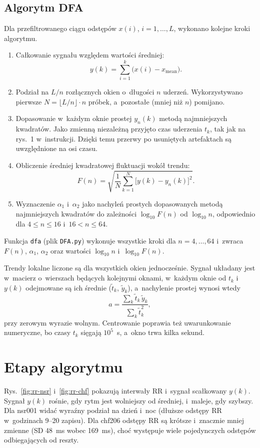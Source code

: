 \documentclass[11pt,a4paper]{article}
\begin{document}
\subsection{Algorytm DFA}
Dla przefiltrowanego ciągu odstępów $x(i)$, $i = 1, \dots, L$, wykonano kolejne kroki algorytmu.
\begin{enumerate}
  \item Całkowanie sygnału względem wartości średniej:
  \begin{equation}
    y(k) = \sum_{i=1}^{k} \big(x(i) - x_{\mathrm{mean}}\big).
  \end{equation}
  \item Podział na $L/n$ rozłącznych okien o~długości $n$ uderzeń. Wykorzystywano pierwsze $N = \lfloor L/n \rfloor \cdot n$ próbek, a~pozostałe (mniej niż $n$) pomijano.
  \item Dopasowanie w~każdym oknie prostej $y_n(k)$ metodą najmniejszych kwadratów. Jako zmienną niezależną przyjęto czas uderzenia $t_k$, tak jak na rys.~1 w~instrukcji. Dzięki temu przerwy po usuniętych artefaktach są uwzględnione na osi czasu.
  \item Obliczenie średniej kwadratowej fluktuacji wokół trendu:
  \begin{equation}
    F(n) = \sqrt{\frac{1}{N} \sum_{k=1}^{N} \big[y(k) - y_n(k)\big]^2}.
  \end{equation}
  \item Wyznaczenie $\alpha_1$ i~$\alpha_2$ jako nachyleń prostych dopasowanych metodą najmniejszych kwadratów do zależności $\log_{10} F(n)$ od $\log_{10} n$, odpowiednio dla $4 \le n \le 16$ i~$16 < n \le 64$.
\end{enumerate}

Funkcja \texttt{dfa} (plik \texttt{DFA.py}) wykonuje wszystkie kroki dla $n = 4, \dots, 64$ i~zwraca $F(n)$, $\alpha_1$, $\alpha_2$ oraz wartości $\log_{10} n$ i~$\log_{10} F(n)$.

Trendy lokalne liczone są dla wszystkich okien jednocześnie. Sygnał układany jest w~macierz o~wierszach będących kolejnymi oknami, w~każdym oknie od $t_k$ i~$y(k)$ odejmowane są ich średnie ($\tilde t_k$, $\tilde y_k$), a~nachylenie prostej wynosi wtedy
\begin{equation}
  a = \frac{\sum_k \tilde t_k \, \tilde y_k}{\sum_k \tilde t_k^2},
\end{equation}
przy zerowym wyrazie wolnym. Centrowanie poprawia też uwarunkowanie numeryczne, bo czasy $t_k$ sięgają $10^5$~s, a~okno trwa kilka sekund.

\section{Etapy algorytmu}
Rys.~\ref{fig:rr-nsr} i~\ref{fig:rr-chf} pokazują interwały RR i~sygnał scałkowany $y(k)$. Sygnał $y(k)$ rośnie, gdy rytm jest wolniejszy od średniej, i~maleje, gdy szybszy. Dla nsr001 widać wyraźny podział na dzień i~noc (dłuższe odstępy RR w~godzinach 9--20 zapisu). Dla chf206 odstępy RR są krótsze i~znacznie mniej zmienne (SD 48~ms wobec 169~ms), choć występuje wiele pojedynczych odstępów odbiegających od reszty.
\end{document}
